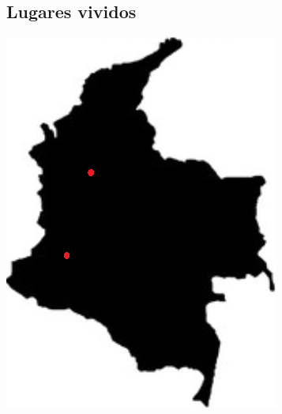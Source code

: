 \documentclass[]{cv-class}
\begin{document}
\begin{aside}
	\section{Lugares vividos}
	\includegraphics[scale=0.42]{img/colombia-logo.png}

\end{aside}
\end{document}
